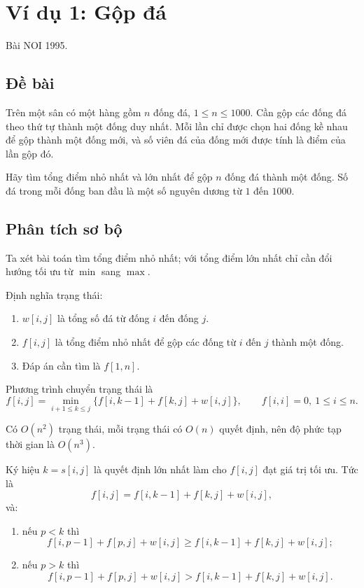 \documentclass[11pt]{article}
\begin{document}
\section{Ví dụ 1: Gộp đá}

Bài NOI 1995.

\subsection*{Đề bài}

Trên một sân có một hàng gồm $n$ đống đá, $1\le n\le 1000$. Cần gộp các đống
đá theo thứ tự thành một đống duy nhất. Mỗi lần chỉ được chọn hai đống kề
nhau để gộp thành một đống mới, và số viên đá của đống mới được tính là điểm
của lần gộp đó.

Hãy tìm tổng điểm nhỏ nhất và lớn nhất để gộp $n$ đống đá thành một đống. Số
đá trong mỗi đống ban đầu là một số nguyên dương từ $1$ đến $1000$.

\subsection*{Phân tích sơ bộ}

Ta xét bài toán tìm tổng điểm nhỏ nhất; với tổng điểm lớn nhất chỉ cần đổi
hướng tối ưu từ $\min$ sang $\max$.

Định nghĩa trạng thái:
\begin{enumerate}
  \item $w[i,j]$ là tổng số đá từ đống $i$ đến đống $j$.
  \item $f[i,j]$ là tổng điểm nhỏ nhất để gộp các đống từ $i$ đến $j$ thành
  một đống.
  \item Đáp án cần tìm là $f[1,n]$.
\end{enumerate}

Phương trình chuyển trạng thái là
\[
  f[i,j]=\min_{i+1\le k\le j}
    \{f[i,k-1]+f[k,j]+w[i,j]\},
  \qquad f[i,i]=0,\ 1\le i\le n.
\]

Có $O(n^2)$ trạng thái, mỗi trạng thái có $O(n)$ quyết định, nên độ phức tạp
thời gian là $O(n^3)$.

Ký hiệu $k=s[i,j]$ là quyết định lớn nhất làm cho $f[i,j]$ đạt giá trị tối
ưu. Tức là
\[
  f[i,j]=f[i,k-1]+f[k,j]+w[i,j],
\]
và:
\begin{enumerate}
  \item nếu $p<k$ thì
  \[
    f[i,p-1]+f[p,j]+w[i,j]\ge f[i,k-1]+f[k,j]+w[i,j];
  \]
  \item nếu $p>k$ thì
  \[
    f[i,p-1]+f[p,j]+w[i,j]>f[i,k-1]+f[k,j]+w[i,j].
  \]
\end{enumerate}
\end{document}
